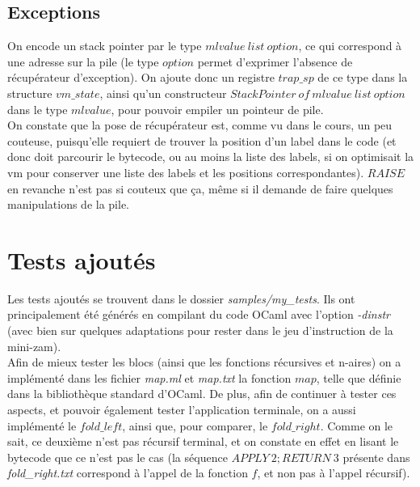 \documentclass{article}
\begin{document}
\subsection{Exceptions}
On encode un stack pointer par le type $mlvalue\:list\:option$, ce qui correspond à une adresse sur la pile (le type $option$ permet d'exprimer l'absence de récupérateur d'exception). On ajoute donc un registre $trap\_sp$ de ce type dans la structure $vm\_state$, ainsi qu'un constructeur $StackPointer\:of\:mlvalue\:list\:option$ dans le type $mlvalue$, pour pouvoir empiler un pointeur de pile.\\
On constate que la pose de récupérateur est, comme vu dans le cours, un peu couteuse, puisqu'elle requiert de trouver la position d'un label dans le code (et donc doit parcourir le bytecode, ou au moins la liste des labels, si on optimisait la vm pour conserver une liste des labels et les positions correspondantes). $RAISE$ en revanche n'est pas si couteux que ça, même si il demande de faire quelques manipulations de la pile.

\section{Tests ajoutés}
Les tests ajoutés se trouvent dans le dossier \textit{samples/my\_tests}. Ils ont principalement été générés en compilant du code OCaml avec l'option \textit{-dinstr} (avec bien sur quelques adaptations pour rester dans le jeu d'instruction de la mini-zam).\\
Afin de mieux tester les blocs (ainsi que les fonctions récursives et n-aires) on a implémenté dans les fichier \textit{map.ml} et \textit{map.txt} la fonction $map$, telle que définie dans la bibliothèque standard d'OCaml. De plus, afin de continuer à tester ces aspects, et pouvoir également tester l'application terminale, on a aussi implémenté le $fold\_left$, ainsi que, pour comparer, le $fold\_right$. Comme on le sait, ce deuxième n'est pas récursif terminal, et on constate en effet en lisant le bytecode que ce n'est pas le cas (la séquence $APPLY\:2; RETURN\:3$ présente dans \textit{fold\_right.txt} correspond à l'appel de la fonction $f$, et non pas à l'appel récursif).
\end{document}
